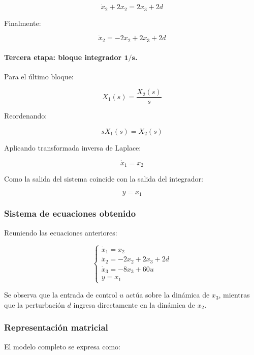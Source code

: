 \documentclass[12pt,a4paper]{article}
\begin{document}
\begin{equation}\dot{x}_2+2x_2=2x_3+2d\end{equation}

Finalmente:

\begin{equation}\boxed{\dot{x}_2=-2x_2+2x_3+2d}\end{equation}
\paragraph{Tercera etapa: bloque integrador $\boldsymbol{1/s}$.} Para el último bloque:

\begin{equation}X_1(s)=\frac{X_2(s)}{s}\end{equation}

Reordenando:

\begin{equation}sX_1(s)=X_2(s)\end{equation}

Aplicando transformada inversa de Laplace:

\begin{equation}\boxed{\dot{x}_1=x_2}\end{equation}

Como la salida del sistema coincide con la salida del integrador:

\begin{equation}\boxed{y=x_1}\end{equation}
\subsubsection*{Sistema de ecuaciones obtenido}
Reuniendo las ecuaciones anteriores:

\begin{equation}\boxed{\begin{cases}\dot{x}_1=x_2\\\dot{x}_2=-2x_2+2x_3+2d\\\dot{x}_3=-8x_3+60u\\y=x_1\end{cases}}\end{equation}

Se observa que la entrada de control $u$ actúa sobre la dinámica de $x_3$, mientras que la perturbación $d$ ingresa directamente en la dinámica de $x_2$.
\subsubsection*{Representación matricial}
El modelo completo se expresa como:
\end{document}

